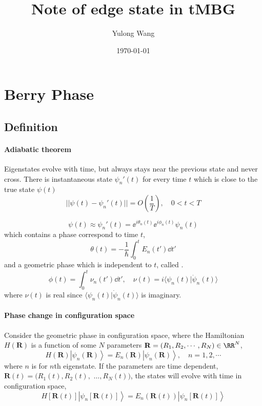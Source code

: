 \documentclass[12pt,a4paper]{article}
\title{Note of edge state in tMBG}
\author{Yulong Wang}
\date{\today}
\newcommand{\ket}[1]{\left|{#1}\right\rangle}
\newcommand{\braket}[2]{\langle{#1}|{#2}\rangle}
\begin{document}
\section{Berry Phase}

\subsection{Definition}

\paragraph{Adiabatic theorem}

    Eigenstates evolve with time, but always stays near the previous state and never cross. There is instantaneous state $\psi_n'(t)$ for every time $t$ which is close to the true state $\psi(t)$
    \begin{equation}
    \label{eq:adiabatic}
        || \psi(t) - \psi_n'(t) || = O(\frac{1}{T}), \quad 0<t<T
    \end{equation}

    \[ \psi(t) \approx \psi_n'(t)
    = \ee^{i\theta_n(t)} \ee^{i\phi_n(t)} \psi_n(t) \]
    which contains a phase correspond to time $t$,
    \[ \theta(t) = -\frac{1}{\hbar} \int_0^t E_n(t') \dd t' \]
    and a geometric phase which is independent to $t$, called .
    \[ \phi(t) = \int_0^t \nu_n(t') \dd t', \quad
    \nu(t) = i \braket{\psi_n(t)}{\dot{\psi}_n(t)} \]
    where $\nu(t)$ is real since $\braket{\psi_n(t)}{\dot{\psi}_n(t)}$ is imaginary.

\paragraph{Phase change in configuration space}

    Consider the geometric phase in configuration space, where the Hamiltonian $H(\mathbf{R})$ is a function of some $N$ parameters $\mathbf{R} = (R_1, R_2, \cdots, R_N) \in \RR^N$,
    \[ H(\mathbf{R}) \ket{\psi_n(\mathbf{R})} = E_n(\mathbf{R}) \ket{\psi_n(\mathbf{R})}, \quad n = 1,2,\cdots \]
    where $n$ is for $n$th eigenstate. If the parameters are time dependent, $\mathbf{R}(t) = (R_1(t), R_2(t), $ $\dots, R_N(t))$, the states will evolve with time in configuration space,
    \[ H[\mathbf{R}(t)] \ket{\psi_n[\mathbf{R}(t)]} = E_n(\mathbf{R}(t)) \ket{\psi_n[\mathbf{R}(t)]} \]
\end{document}
